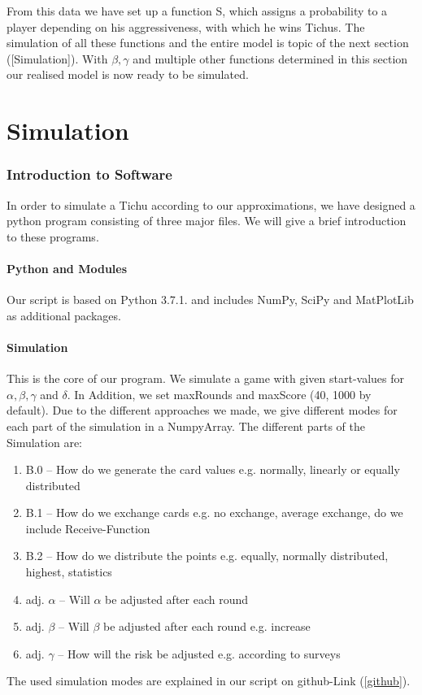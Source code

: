 From this data we have set up a function S, which assigns a probability to a player depending on his aggressiveness, with which he wins Tichus. The simulation of all these functions and the entire model is topic  of the next section ([Simulation]). With $\beta,\gamma$ and multiple other functions determined in this section our realised model is now ready to be simulated.

\section{Simulation}
\subsubsection{Introduction to Software}
In order to simulate a Tichu according to our approximations, we have designed a python program consisting of three major files. We will give a brief introduction to these programs.

\paragraph{Python and Modules}
Our script is based on Python 3.7.1. and includes NumPy, SciPy and MatPlotLib as additional packages. 

\paragraph{Simulation}
This is the core of our program. We simulate a game with given start-values for $\alpha, \beta, \gamma$ and $\delta$. In Addition, we set maxRounds and maxScore (40, 1000 by default). 
Due to the different approaches we made, we give different modes for each part of the simulation in a NumpyArray. The different parts of the Simulation are:
\begin{enumerate}
\item B.0 – How do we generate the card values e.g. normally, linearly or equally distributed
\item B.1 – How do we exchange cards e.g. no exchange, average exchange, do we include Receive-Function
\item B.2 – How do we distribute the points e.g. equally, normally distributed, highest, statistics
\item adj. $\alpha$ – Will $\alpha$ be adjusted after each round
\item adj. $\beta$ – Will $\beta$ be adjusted after each round e.g. increase
\item adj. $\gamma$ – How will the risk be adjusted e.g. according to surveys
\end{enumerate}
The used simulation modes are explained in our script on github-Link (\ref{github}).

